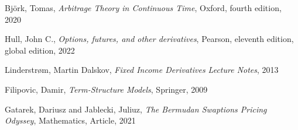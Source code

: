 \clearpage
{}

\begin{thebibliography}{25}
Björk, Tomas,
\emph{Arbitrage Theory in Continuous Time},
 Oxford, fourth edition, 2020

Hull, John C., 
\emph{Options, futures, and other derivatives},
Pearson, eleventh edition, global edition, 2022

Linderstrøm, Martin Dalskov, 
\emph{Fixed Income Derivatives Lecture Notes},
2013

Filipovic, Damir, \emph{Term-Structure Models}, 
Springer, 2009

Gatarek, Dariusz and Jablecki, Juliuz, \emph{The Bermudan Swaptions Pricing Odyssey},
Mathematics, Article, 2021

\end{thebibliography}

